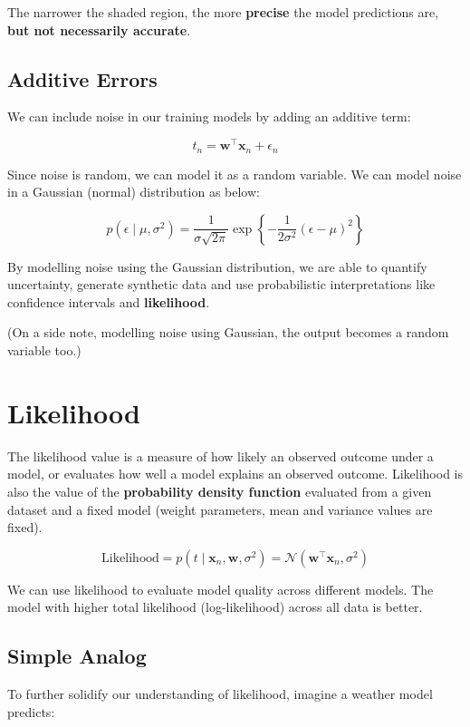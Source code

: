\documentclass[12pt]{article}
\begin{document}
The narrower the shaded region, the more \textbf{precise} the model predictions are, \textbf{but not necessarily accurate}.

\subsection{Additive Errors}
We can include noise in our training models by adding an additive term:
\vspace{0.5em}

\[
t_n = \mathbf{w}^\top \mathbf{x}_n + \epsilon_n
\]
\vspace{0.5em}

Since noise is random, we can model it as a random variable. We can model noise in a Gaussian (normal) distribution as below:
\vspace{0.5em}

\[
p(\epsilon \mid \mu, \sigma^2) = \frac{1}{\sigma \sqrt{2\pi}} \exp\left\{ -\frac{1}{2\sigma^2} (\epsilon - \mu)^2 \right\}
\]
\vspace{0.5em}

By modelling noise using the Gaussian distribution, we are able to quantify uncertainty, generate synthetic data and use probabilistic interpretations like confidence intervals and \textbf{likelihood}. 


(On a side note, modelling noise using Gaussian, the output becomes a random variable too.)

\newpage
\section{Likelihood}
The likelihood value is a measure of how likely an observed outcome under a model, or evaluates how well a model explains an observed outcome. Likelihood is also the value of the \textbf{probability density function} evaluated from a given dataset and a fixed model (weight parameters, mean and variance values are fixed).
\vspace{0.5em}

\[
\text{Likelihood} = p(t \mid \mathbf{x}_n, \mathbf{w}, \sigma^2) = \mathcal{N}(\mathbf{w}^\top \mathbf{x}_n, \sigma^2)
\]
\vspace{0.5em}

We can use likelihood to evaluate model quality across different models. The model with higher total likelihood (log-likelihood) across all data is better.

\subsection{Simple Analog}
To further solidify our understanding of likelihood, imagine a weather model predicts:
\end{document}
